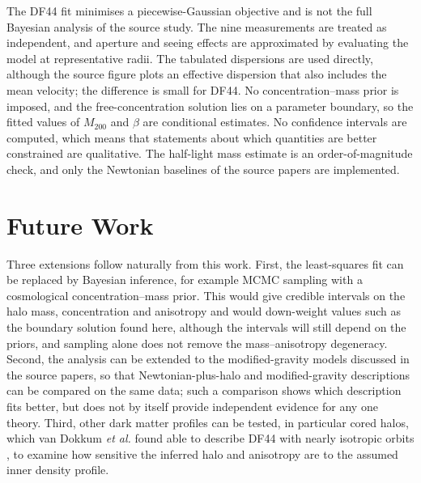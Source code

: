 \documentclass[12pt,a4paper]{report}
\numberwithin{equation}{chapter}
\begin{document}
The DF44 fit minimises a piecewise-Gaussian objective and is not the full Bayesian analysis of the source study. The nine measurements are treated as independent, and aperture and seeing effects are approximated by evaluating the model at representative radii. The tabulated dispersions are used directly, although the source figure plots an effective dispersion that also includes the mean velocity; the difference is small for DF44. No concentration--mass prior is imposed, and the free-concentration solution lies on a parameter boundary, so the fitted values of $M_{200}$ and $\beta$ are conditional estimates. No confidence intervals are computed, which means that statements about which quantities are better constrained are qualitative. The half-light mass estimate is an order-of-magnitude check, and only the Newtonian baselines of the source papers are implemented.

\section{Future Work}

Three extensions follow naturally from this work. First, the least-squares fit can be replaced by Bayesian inference, for example MCMC sampling with a cosmological concentration--mass prior. This would give credible intervals on the halo mass, concentration and anisotropy and would down-weight values such as the boundary solution found here, although the intervals will still depend on the priors, and sampling alone does not remove the mass--anisotropy degeneracy. Second, the analysis can be extended to the modified-gravity models discussed in the source papers, so that Newtonian-plus-halo and modified-gravity descriptions can be compared on the same data; such a comparison shows which description fits better, but does not by itself provide independent evidence for any one theory. Third, other dark matter profiles can be tested, in particular cored halos, which van Dokkum \emph{et al.} found able to describe DF44 with nearly isotropic orbits \cite{vandokkumdf44_2019}, to examine how sensitive the inferred halo and anisotropy are to the assumed inner density profile.
\end{document}

